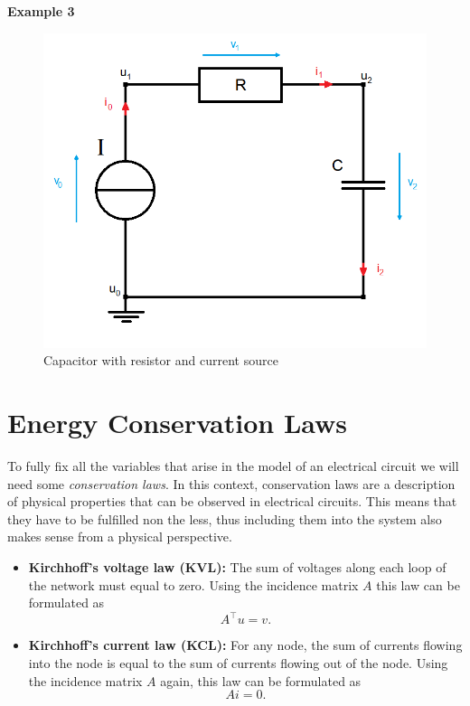 \textbf{Example 3} \label{ex:Example 3 } \\

\begin{figure}[H]
	\label{circuit:Example 3}
	\centering
	\includegraphics[scale=0.5]{pictures/Example3.png}
	\caption{Capacitor with resistor and current source}
\end{figure}



\section{Energy Conservation Laws}
To fully fix all the variables that arise in the model of an electrical circuit we will need some \emph{conservation laws}. In this context, conservation laws are a description of physical properties that can be observed in electrical circuits. This means that they have to be fulfilled non the less, thus including them into the system also makes sense from a physical perspective. 
\begin{itemize}
	\item \textbf{Kirchhoff's voltage law (KVL):} \newline
	The sum of voltages along each loop of the network must equal to zero. Using the incidence matrix $A$ this law can be formulated as
	\begin{equation}
		\label{KVL}
		A^\top  u = v.
	\end{equation}
	\item \textbf{Kirchhoff's current law (KCL):} \newline
	For any node, the sum of currents flowing into the node is equal to the sum of currents flowing out of the node. Using the incidence matrix $A$ again, this law can be formulated as
	\begin{equation}
		\label{KCL}
		A  i = 0.
	\end{equation}
\end{itemize}

